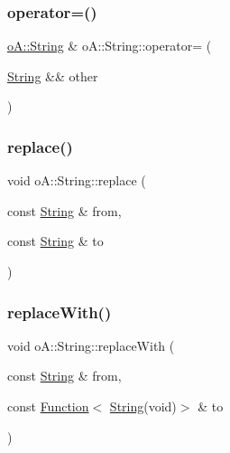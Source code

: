 \mbox{\label{classo_a_1_1_string_ab45f150390030ee04c119399a4c9fbb7}} 
\subsubsection{\texorpdfstring{operator=()}{operator=()}\hspace{0.1cm}{\footnotesize\ttfamily [2/2]}}
{\footnotesize\ttfamily \mbox{\hyperlink{classo_a_1_1_string}{o\+A\+::\+String}} \& o\+A\+::\+String\+::operator= (\begin{DoxyParamCaption}\item[{\mbox{\hyperlink{classo_a_1_1_string}{String}} \&\&}]{other }\end{DoxyParamCaption})\hspace{0.3cm}{\ttfamily [noexcept]}}

\mbox{\label{classo_a_1_1_string_a54760c3b5fee78fbcc28a6d81dbfe6b3}} 
\subsubsection{\texorpdfstring{replace()}{replace()}}
{\footnotesize\ttfamily void o\+A\+::\+String\+::replace (\begin{DoxyParamCaption}\item[{const \mbox{\hyperlink{classo_a_1_1_string}{String}} \&}]{from,  }\item[{const \mbox{\hyperlink{classo_a_1_1_string}{String}} \&}]{to }\end{DoxyParamCaption})}

\mbox{\label{classo_a_1_1_string_a9f974d8b83a0ae4232a33d249291f3c4}} 
\subsubsection{\texorpdfstring{replace\+With()}{replaceWith()}}
{\footnotesize\ttfamily void o\+A\+::\+String\+::replace\+With (\begin{DoxyParamCaption}\item[{const \mbox{\hyperlink{classo_a_1_1_string}{String}} \&}]{from,  }\item[{const \mbox{\hyperlink{namespaceo_a_a85bea86b9d05d2b86c77d8ee5b7bbde5}{Function}}$<$ \mbox{\hyperlink{classo_a_1_1_string}{String}}(void)$>$ \&}]{to }\end{DoxyParamCaption})}

